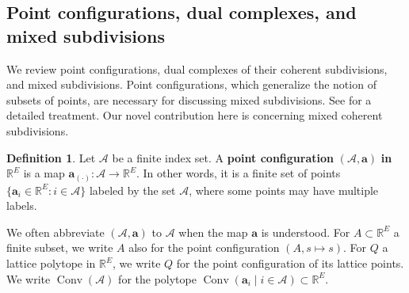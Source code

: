\documentclass[11pt]{amsart}
\newcommand{\RR}{\mathbb R}
\newcommand{\PP}{\mathbb P}
\newcommand{\TT}{\mathbb T}
\theoremstyle{definition}
\newtheorem{defn}[thm]{Definition}
\newcommand{\chris}[1]{{\color{cyan} \sf Chris: [#1]}}
\begin{document}
\subsection{Point configurations, dual complexes, and mixed subdivisions}
\label{subsec:mixedsub}

We review point configurations, dual complexes of their coherent subdivisions, and mixed subdivisions. Point configurations, which generalize the notion of subsets of points, are necessary for discussing mixed subdivisions.  See \cite{DLRS10} for a detailed treatment.  Our novel contribution here is  concerning mixed coherent subdivisions.


\begin{defn}
Let $\mathcal A$ be a finite index set.  A \textbf{point configuration} $(\mathcal A, \mathbf a)$ \textbf{in} $\RR^E$ is a map $\mathbf a_{(\cdot)}: \mathcal  A \to \RR^{E}$.  In other words, it is a finite set of points $\{\mathbf a_i \in \RR^E: i\in \mathcal A\}$ labeled by the set $\mathcal A$, where some points may have multiple labels.
\end{defn}

We often abbreviate $(\mathcal A, \mathbf a)$ to $\mathcal A$ when the map $\mathbf a$ is understood.  For $A\subset \RR^E$ a finite subset, we write $A$ also for the point configuration $(A, s\mapsto s)$.  
For $Q$ a lattice polytope in $\RR^E$, we write $Q$ for the point configuration of its lattice points.  We write $\operatorname{Conv}(\mathcal A)$ for the polytope $\operatorname{Conv}(\mathbf a_i \mid i\in \mathcal A) \subset \RR^E$.
\end{document}
